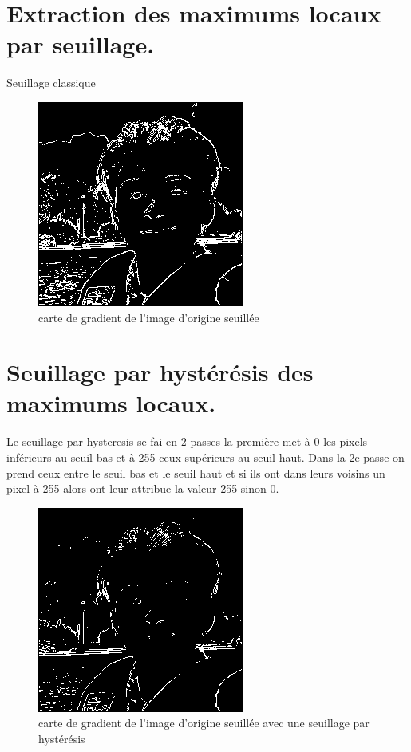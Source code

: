 \documentclass{article}
\begin{document}
\section{Extraction des maximums locaux par seuillage.}
Seuillage classique
\begin{figure}[h!]
\centerline{\includegraphics[scale=1.]{./rendus/cartegradientSeuillee.png}}
\caption{carte de gradient de l'image d'origine seuillée}
\end{figure}

\newpage
\section{Seuillage par hystérésis des maximums locaux.}
Le seuillage par hysteresis se fai en 2 passes la première met à 0 les pixels inférieurs au seuil bas et à 255 ceux supérieurs au seuil haut.
Dans la 2e passe on prend ceux entre le seuil bas et le seuil haut et si ils ont dans leurs voisins un pixel à 255 alors ont leur attribue la valeur 255 sinon 0.
\begin{figure}[h!]
\centerline{\includegraphics[scale=1.]{./rendus/cartegradientSeuilleeHysteresis.png}}
\caption{carte de gradient de l'image d'origine seuillée avec une seuillage par hystérésis}
\end{figure}
\end{document}
